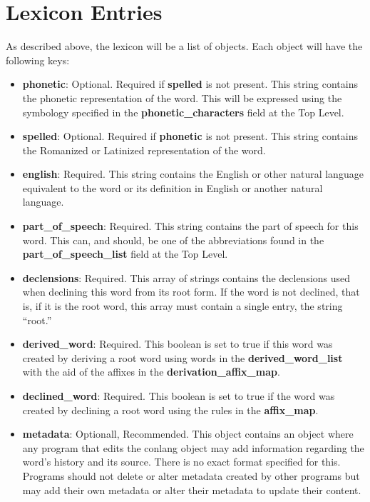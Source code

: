 \chapter{Lexicon Entries}
As described above, the lexicon will be a list of objects.  Each object will have the following keys:
\begin{itemize}
	\item \textbf{phonetic}: Optional.  Required if \textbf{spelled} is not present. This string contains the phonetic representation of the word.  This will be expressed using the symbology specified in the \textbf{phonetic\_characters} field at the Top Level.
	\item \textbf{spelled}: Optional. Required if \textbf{phonetic} is not present.  This string contains the Romanized or Latinized representation of the word.
	\item \textbf{english}: Required. This string contains the English or other natural language equivalent to the word or its definition in English or another natural language.
	\item \textbf{part\_of\_speech}: Required.  This string contains the part of speech for this word.  This can, and should, be one of the abbreviations found in the \textbf{part\_of\_speech\_list} field at the Top Level.
	\item \textbf{declensions}: Required.  This array of strings contains the declensions used when declining this word from its root form.  If the word is not declined, that is, if it is the root word, this array must contain a single entry, the string ``root.''
	\item \textbf{derived\_word}: Required.  This boolean is set to true if this word was created by deriving a root word using words in the \textbf{derived\_word\_list} with the aid of the affixes in the \textbf{derivation\_affix\_map}.
	\item \textbf{declined\_word}: Required. This boolean is set to true if the word was created by declining a root word using the rules in the \textbf{affix\_map}.
	\item \textbf{metadata}: Optionall, Recommended. This object contains an object where any program that edits the conlang object may add information regarding the word's history and its source.  There is no exact format specified for this.  Programs should not delete or alter metadata created by other programs but may add their own metadata or alter their metadata to update their content.  
\end{itemize}






